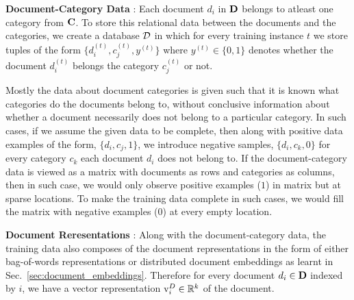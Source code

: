 \textbf{Document-Category Data} : 
Each document $d_{i}$ in $\mathbf{D}$ belongs to atleast one category from $\mathbf{C}$. To store this relational data between the documents and the categories, we create a database $\mathcal{D}$ in which for every training instance $t$ we store tuples of the form $\{ d^{(t)}_{i}, c^{(t)}_{j}, y^{(t)}\}$ where $y^{(t)} \in \{0, 1\}$ denotes whether the document $d^{(t)}_{i}$ belongs the category $c^{(t)}_{j}$ or not. 

Mostly the data about document categories is given such that it is known what categories do the documents belong to, without conclusive information about whether a document necessarily does not belong to a particular category. In such cases, if we assume the given data to be complete, then along with positive data examples of the form, $\{ d_{i}, c_{j}, 1\}$, we introduce negative samples, $\{ d_{i}, c_{k}, 0\}$ for every category $c_{k}$ each document $d_{i}$ does not belong to. 
If the document-category data is viewed as a matrix with documents as rows and categories as columns, then in such case, we would only observe positive examples ($1$) in matrix but at sparse locations. To make the training data complete in such cases, we would fill the matrix with negative examples ($0$) at every empty location.

\textbf{Document Reresentations} : 
Along with the document-category data, the training data also composes of the document representations in the form of either bag-of-words representations or distributed document embeddings as learnt in Sec.~\ref{sec:document_embeddings}.  Therefore for every document $d_{i} \in \mathbf{D}$ indexed by $i$, we have a vector representation $\mathrm{v}^{D}_{i} \in \mathbb{R}^{k}$ of the document.

